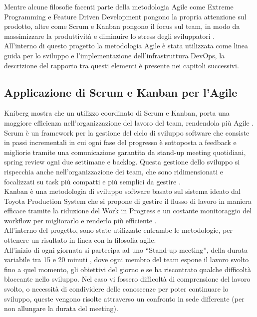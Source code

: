 \documentclass[a4paper, 12pt]{report}
\numberwithin{equation}{section}
\begin{document}
Mentre alcune filosofie facenti parte della metodologia Agile come Extreme Programming e Feature Driven Development pongono la propria attenzione sul prodotto, altre come Scrum e Kanban \cite{kumar-agile}  pongono il focus sul team, in modo da massimizzare la produttività e diminuire lo stress degli sviluppatori \cite{melo-agile}.\\
All’interno di questo progetto la metodologia Agile è stata utilizzata come linea guida per lo sviluppo e l’implementazione dell’infrastruttura DevOps, la descrizione del rapporto tra questi elementi è presente nei capitoli successivi.
\subsection{Applicazione di Scrum e Kanban per l'Agile}
Kniberg mostra che un utilizzo coordinato di Scrum e Kanban, porta una maggiore efficienza nell'organizzazione del lavoro del team, rendendola più Agile \cite{kniberg-agile}.\\
Scrum è un framework per la gestione del ciclo di sviluppo software che consiste in passi incrementali in cui ogni fase del progresso è sottoposta a feedback e migliorie tramite una comunicazione garantita da stand-up meeting quotidiani, spring review ogni due settimane e backlog. Questa gestione dello sviluppo si rispecchia anche nell’organizzazione dei team, che sono ridimensionati e focalizzati su task più compatti e più semplici da gestire \cite{schwaber-agile}.\\
Kanban è una metodologia di sviluppo software basato sul sistema ideato dal Toyota Production System che si propone di gestire il flusso di lavoro in maniera efficace tramite la riduzione del Work in Progress e un costante monitoraggio del workflow per migliorarlo e renderlo più efficiente \cite{klipp-agile}.\\
All’interno del progetto, sono state utilizzate entrambe le metodologie, per ottenere un risultato in linea con la filosofia agile.\\
All’inizio di ogni giornata si partecipa ad uno “Stand-up meeting”, della durata variabile tra 15 e 20 minuti \cite{hasnain-agile}, dove ogni membro del team espone il lavoro svolto fino a quel momento, gli obiettivi del giorno e se ha riscontrato qualche difficoltà bloccante nello sviluppo. Nel caso vi fossero difficoltà di comprensione del lavoro svolto, o necessità di condividere delle conoscenze per poter continuare lo sviluppo, queste vengono risolte attraverso un confronto in sede differente (per non allungare la durata del meeting).\\
\end{document}
